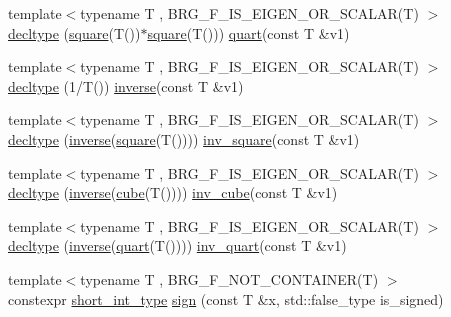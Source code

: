 \begin{DoxyCompactItemize}
\item 
{\footnotesize template$<$typename T , B\-R\-G\-\_\-\-F\-\_\-\-I\-S\-\_\-\-E\-I\-G\-E\-N\-\_\-\-O\-R\-\_\-\-S\-C\-A\-L\-A\-R(\-T) $>$ }\\\hyperlink{namespaceIceBRG_a62458098fc6695edb9a247651fe42e95}{decltype} (\hyperlink{namespaceIceBRG_a97aa4e94a7b6218fcb6f9689e1f6b557}{square}(T())$\ast$\hyperlink{namespaceIceBRG_a97aa4e94a7b6218fcb6f9689e1f6b557}{square}(T())) \hyperlink{namespaceIceBRG_af54e101d5c62b8c91bfb607c86335ac8}{quart}(const T \&v1)
\item 
{\footnotesize template$<$typename T , B\-R\-G\-\_\-\-F\-\_\-\-I\-S\-\_\-\-E\-I\-G\-E\-N\-\_\-\-O\-R\-\_\-\-S\-C\-A\-L\-A\-R(\-T) $>$ }\\\hyperlink{namespaceIceBRG_a928fda4d79658387456d3df712e9c00c}{decltype} (1/T()) \hyperlink{namespaceIceBRG_ab6a58902bc117f9f8bf7ba9f8211a4bb}{inverse}(const T \&v1)
\item 
{\footnotesize template$<$typename T , B\-R\-G\-\_\-\-F\-\_\-\-I\-S\-\_\-\-E\-I\-G\-E\-N\-\_\-\-O\-R\-\_\-\-S\-C\-A\-L\-A\-R(\-T) $>$ }\\\hyperlink{namespaceIceBRG_a2a3967207326fe59b812a9b8ede357d2}{decltype} (\hyperlink{namespaceIceBRG_ab6a58902bc117f9f8bf7ba9f8211a4bb}{inverse}(\hyperlink{namespaceIceBRG_a97aa4e94a7b6218fcb6f9689e1f6b557}{square}(T()))) \hyperlink{namespaceIceBRG_a49bbe2d1cefc03dfb98f65daa1ebf19b}{inv\-\_\-square}(const T \&v1)
\item 
{\footnotesize template$<$typename T , B\-R\-G\-\_\-\-F\-\_\-\-I\-S\-\_\-\-E\-I\-G\-E\-N\-\_\-\-O\-R\-\_\-\-S\-C\-A\-L\-A\-R(\-T) $>$ }\\\hyperlink{namespaceIceBRG_a93717da016c6d982220bdcac8fd5cb47}{decltype} (\hyperlink{namespaceIceBRG_ab6a58902bc117f9f8bf7ba9f8211a4bb}{inverse}(\hyperlink{namespaceIceBRG_a2cdc8520f62b9c88cfcd50132fd80ee4}{cube}(T()))) \hyperlink{namespaceIceBRG_a6ffc82b0f391872a4a42bfa5a2fdb843}{inv\-\_\-cube}(const T \&v1)
\item 
{\footnotesize template$<$typename T , B\-R\-G\-\_\-\-F\-\_\-\-I\-S\-\_\-\-E\-I\-G\-E\-N\-\_\-\-O\-R\-\_\-\-S\-C\-A\-L\-A\-R(\-T) $>$ }\\\hyperlink{namespaceIceBRG_a2cba46b977bd21e8146a0d25ec0132cc}{decltype} (\hyperlink{namespaceIceBRG_ab6a58902bc117f9f8bf7ba9f8211a4bb}{inverse}(\hyperlink{namespaceIceBRG_af54e101d5c62b8c91bfb607c86335ac8}{quart}(T()))) \hyperlink{namespaceIceBRG_aa9817804e41ecd000dfbd83394b93d27}{inv\-\_\-quart}(const T \&v1)
\item 
{\footnotesize template$<$typename T , B\-R\-G\-\_\-\-F\-\_\-\-N\-O\-T\-\_\-\-C\-O\-N\-T\-A\-I\-N\-E\-R(\-T) $>$ }\\constexpr \hyperlink{lib_2IceBRG__main_2common_8h_a9a4c2c3afa89b73437fa1d63d607c7c1}{short\-\_\-int\-\_\-type} \hyperlink{namespaceIceBRG_aed6c1ff50448ae44b342bd1be9f27745}{sign} (const T \&x, std\-::false\-\_\-type is\-\_\-signed)

\end{DoxyCompactItemize}
